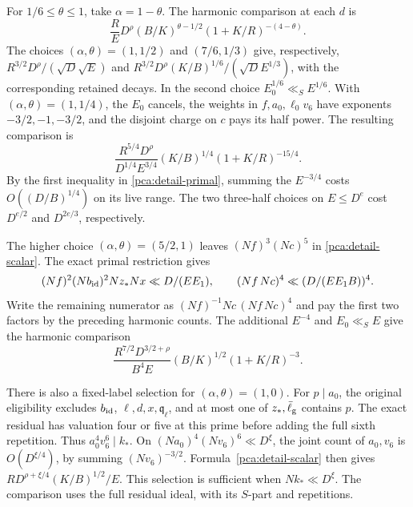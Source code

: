 For \(1/6\le\theta\le1\), take \(\alpha=1-\theta\).
The harmonic comparison at each \(d\) is
\begin{equation}\label{pca:detail-harmonic}
 \frac R E D^\rho (B/K)^{\theta-1/2}
                   (1+K/R)^{-(4-\theta)}.
\end{equation}
The choices \((\alpha,\theta)=(1,1/2)\) and \((7/6,1/3)\)
give, respectively, \(R^{3/2}D^\rho/(\sqrt D\sqrt E)\) and
\(R^{3/2}D^\rho(K/B)^{1/6}/(\sqrt D E^{1/3})\), with the
corresponding retained decays. In the second choice
\(E_0^{1/6}\ll_S E^{1/6}\). With \((\alpha,\theta)=(1,1/4)\),
the \(E_0\) cancels, the weights in \(f,a_0,\ell_0v_6\) have
exponents \(-3/2,-1,-3/2\), and the disjoint charge on \(c\)
pays its half power. The resulting comparison is
\begin{equation}\label{pca:detail-quarter}
 \frac{R^{5/4}D^\rho}{D^{1/4}E^{3/4}}
             (K/B)^{1/4}(1+K/R)^{-15/4}.
\end{equation}
By the first inequality in \eqref{pca:detail-primal}, summing
the \(E^{-3/4}\) costs \(O((D/B)^{1/4})\) on its live range.
The two three-half choices on \(E\le D^e\) cost
\(D^{e/2}\) and \(D^{2e/3}\), respectively.

The higher choice \((\alpha,\theta)=(5/2,1)\) leaves
\((Nf)^3(Nc)^5\) in \eqref{pca:detail-scalar}.
The exact primal restriction gives
\[
 (Nf)^2(Nb_{\rm id})^2Nz_*Nx\ll D/(E E_1),
 \qquad (Nf\,Nc)^4\ll (D/(E E_1B))^4 .
\]
Write the remaining numerator as
\((Nf)^{-1}Nc\,(Nf\,Nc)^4\) and pay the first two factors by
the preceding harmonic counts. The additional \(E^{-4}\) and
\(E_0\ll_S E\) give the harmonic comparison
\begin{equation}\label{pca:detail-high}
 \frac{R^{7/2}D^{3/2+\rho}}{B^4 E}
                 (B/K)^{1/2}(1+K/R)^{-3}.
\end{equation}

There is also a fixed-label selection for \((\alpha,\theta)=(1,0)\).
For \(p\mid a_0\), the original eligibility excludes \(b_{\rm id}\),
\(\ell,d,x,\mathfrak q_\ell\), and at most one of \(z_*,\bar\ell_{\rm g}\)
contains \(p\). The exact residual has valuation four or five at this
prime before adding the full sixth repetition. Thus
\(a_0^4v_6^6\mid k_*\). On \((Na_0)^4(Nv_6)^6\ll D^\xi\),
the joint count of \(a_0,v_6\) is \(O(D^{\xi/4})\), by summing
\((Nv_6)^{-3/2}\). Formula~\eqref{pca:detail-scalar} then gives
\(R D^{\rho+\xi/4}(K/B)^{1/2}/E\). This selection is sufficient
when \(Nk_*\ll D^\xi\). The comparison uses the full residual
ideal, with its \(S\)-part and repetitions.

